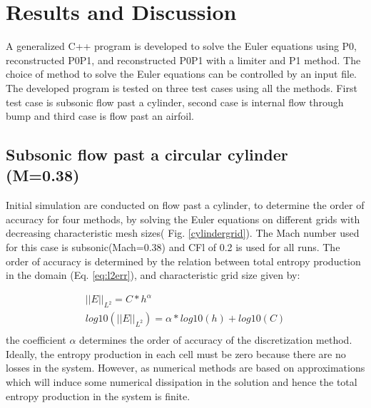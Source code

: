 \documentclass[12pt]{elsarticle}
\begin{document}
	\section{Results and Discussion}
	A generalized C++ program is developed to solve the Euler equations using P0, reconstructed P0P1, and reconstructed P0P1 with a limiter and P1 method. The choice of method to solve the Euler equations can be controlled by an input file. The developed program is tested on three test cases using all the methods. First test case is subsonic flow past a cylinder, second case is internal flow through bump and third case is flow past an airfoil. 
	
	\subsection{Subsonic flow past a circular cylinder (M=0.38)}
	Initial simulation are conducted on flow past a cylinder, to determine the order of accuracy for four methods, by solving the Euler equations on different grids with decreasing characteristic mesh sizes( Fig. \ref{cylindergrid}). The Mach number used for this case is subsonic(Mach=0.38) and CFl of 0.2 is used for all runs. The order of accuracy is determined by the relation between total entropy production in the domain (Eq. \ref{eq:l2err}), and characteristic grid size given by:
	
	\begin{equation}
		\begin{gathered}
			||E||_{L^2}=C*h^{\alpha}\\
			log10(||E||_{L^2})={\alpha}*log10(h)+log10(C)\\
		\end{gathered}
	\end{equation}
	the coefficient $\alpha$ determines the order of accuracy of the discretization method. Ideally, the entropy production in each cell must be zero because there are no losses in the system. However, as numerical methods are based on approximations which will induce some numerical dissipation in the solution and hence the total entropy production in the system is finite. 
	
\end{document}
